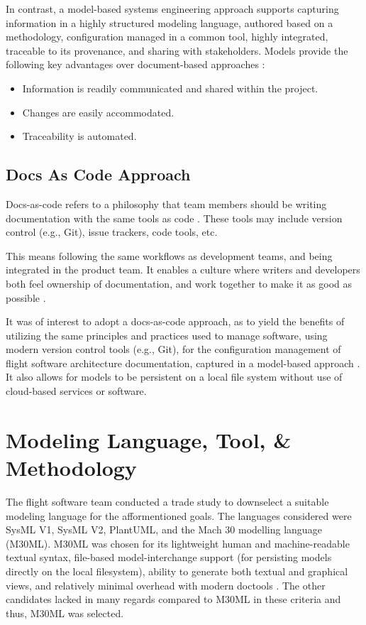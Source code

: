 \documentclass[conf]{new-aiaa}
\begin{document}
In contrast, a model-based systems engineering approach supports capturing information in a highly structured modeling language, authored based on a methodology, configuration managed in a common tool, highly integrated, traceable to its provenance, and sharing with stakeholders. Models provide the following key advantages over document-based approaches \cite{ibm_mbse}:

\begin{itemize}
    \item Information is readily communicated and shared within the project.
    
    \item Changes are easily accommodated.
    
    \item Traceability is automated.
\end{itemize}

\subsection{Docs As Code Approach}

Docs-as-code refers to a philosophy that team members should be writing documentation with the same tools as code \cite{docs_as_code}.  These tools may include version control (e.g., Git), issue trackers, code tools, etc.

\begin{quoting}
    This means following the same workflows as development teams, and being integrated in the product team. It enables a culture where writers and developers both feel ownership of documentation, and work together to make it as good as possible \cite{docs_as_code}. 
\end{quoting}

It was of interest to adopt a docs-as-code approach, as to yield the benefits of utilizing the same principles and practices used to manage software, using modern version control tools (e.g., Git), for the configuration management of flight software architecture documentation, captured in a model-based approach \cite{docs_as_code}. It also allows for models to be persistent on a local file system without use of cloud-based services or software.


\section{Modeling Language, Tool, \& Methodology}

The flight software team conducted a trade study to downselect a suitable modeling language for the afformentioned goals. The languages considered were SysML V1, SysML V2, PlantUML, and the Mach 30 modelling language (M30ML). M30ML was chosen for its lightweight human and machine-readable textual syntax, file-based model-interchange support (for persisting models directly on the local filesystem), ability to generate both textual and graphical views, and relatively minimal overhead with modern doctools \cite{mach30_git}. The other candidates lacked in many regards compared to M30ML in these criteria and thus, M30ML was selected.
\end{document}
